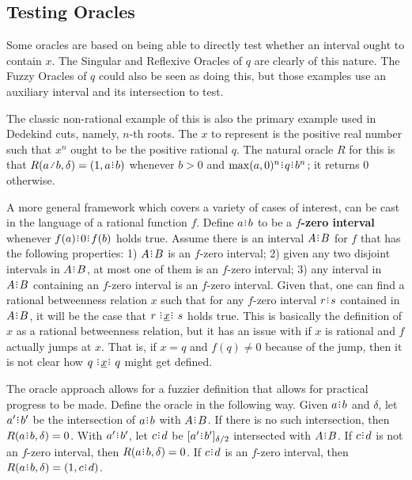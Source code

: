\documentclass[12pt]{article}
\begin{document}
\subsection{Testing Oracles}

Some oracles are based on being able to directly test whether an interval ought to contain $x$. The Singular and Reflexive Oracles of $q$ are clearly of this nature. The Fuzzy Oracles of $q$ could also be seen as doing this, but those examples use an auxiliary interval and its intersection to test. 

The classic non-rational example of this is also the primary example used in Dedekind cuts, namely, $n$-th roots. The $x$ to represent is the positive real number such that $x^n$ ought to be the positive rational $q$. The natural oracle $R$ for this is that $R(a\lte b, \delta) = (1, a\rint b)$ whenever $b > 0$ and $\max(a, 0)^n\rint q\rint b^n$; it returns $0$ otherwise. 

A more general framework which covers a variety of cases of interest, can be cast in the language of a rational function $f$. Define $a\rint b$ to be a \textbf{$f$-zero interval} whenever $f(a)\rint 0\rint f(b)$ holds true. Assume there is an interval $A \rint B$ for $f$ that has the following properties: 1) $A \rint B$ is an $f$-zero interval; 2) given any two disjoint intervals in $A \rint B$, at most one of them is an $f$-zero interval; 3) any interval in $A \rint B$ containing an $f$-zero interval is an $f$-zero interval. Given that, one can find a rational betweenness relation $x$ such that for any $f$-zero interval $r\rint s$ contained in $A \rint B$, it will be the case that $r \xrel s$ holds true. This is basically the definition of $x$ as a rational betweenness relation, but it has an issue with if $x$ is rational and $f$ actually jumps at $x$. That is, if $x=q$ and $f(q) \neq 0$ because of the jump, then it is not clear how $q \xrel q$ might get defined. 

The oracle approach allows for a fuzzier definition that allows for practical progress to be made. Define the oracle in the following way. Given $a \rint b$ and $\delta$, let $a' \rint b'$ be the intersection of $a\rint b$ with $A \rint B$. If there is no such intersection, then $R(a \rint b, \delta) = 0$. With $a' \rint b'$, let $c \rint d$ be $\clhalo[\delta/2]{a' \rint b'}$ intersected with $A \rint B$. If $c \rint d$ is not an $f$-zero interval, then $R(a \rint b, \delta) = 0$. If $c \rint d$ is an $f$-zero interval, then $R(a \rint b, \delta) = (1, c \rint d)$.
\end{document}

